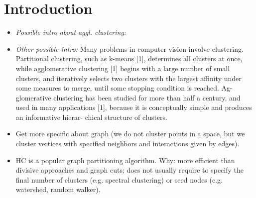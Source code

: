 
\section{Introduction}

\begin{itemize}
\item \emph{Possible intro about aggl. clustering:}  %



\item \emph{Other possible intro:} Many problems in computer vision involve clustering. Partitional clustering, such as k-means [1], determines all clusters at once, while agglomerative clustering [1] begins with a large number of small clusters, and iteratively selects two clusters with the largest affinity under some measures to merge, until some stopping condition is reached. Ag- glomerative clustering has been studied for more than half a century, and used in many applications [1], because it is conceptually simple and produces an informative hierar- chical structure of clusters. %

\item Get more specific about graph (we do not cluster points in a space, but we cluster vertices with specified neighbors and interactions given by edges). 

\item HC is a popular graph partitioning algorithm. Why: more efficient than divisive approaches and graph cuts; does not usually require to specify the final number of clusters (e.g. spectral clustering) or seed nodes (e.g. watershed, random walker). 


\end{itemize}
